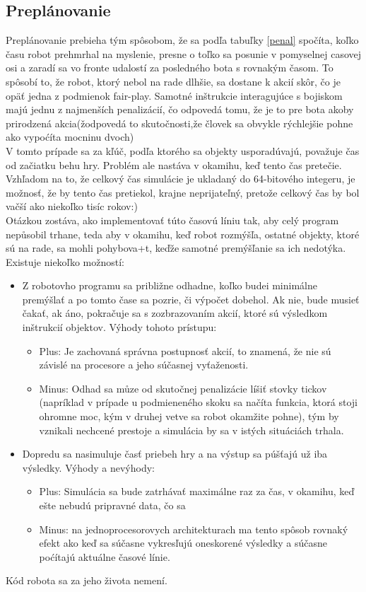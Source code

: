 \subsection{Preplánovanie}
Preplánovanie prebieha tým spôsobom, že sa podľa tabuľky \ref{penal} spočíta, koľko času robot prehmrhal na myslenie, presne o toľko sa posunie v pomyselnej casovej osi a zaradí sa vo fronte udalostí za posledného bota s rovnakým časom. To spôsobí to, že robot, ktorý nebol na rade dlhšie, sa dostane k akcií skôr, čo je opäť jedna z podmienok fair-play. Samotné inštrukcie interagujúce s bojiskom  majú jednu z najmenších penalizácií, čo odpovedá tomu, že je to pre bota akoby prirodzená akcia(žodpovedá to skutočnosti,že človek sa obvykle rýchlejšie pohne ako vypoćíta mocninu dvoch) \\
V tomto prípade sa za kľúč, podľa ktorého sa objekty usporadúvajú, považuje čas od začiatku behu hry. Problém ale nastáva v okamihu, keď tento čas pretečie. Vzhľadom na to, že celkový čas simulácie je ukladaný do 64-bitového integeru, je možnosť, že by tento čas pretiekol, krajne neprijateľný, pretože celkový čas by bol vačší ako niekoľko tisíc rokov:)\\
Otázkou zostáva, ako implementovať túto časovú líniu tak, aby celý program nepůsobil trhane, teda aby v okamihu, keď robot rozmýšľa, ostatné objekty, ktoré sú na rade, sa mohli pohybova+t, keďže samotné premýšľanie sa ich nedotýka. Existuje niekoľko možností:
\begin{itemize}
\item Z robotovho programu sa približne odhadne, koľko budei minimálne premýšlať a po tomto čase sa pozrie, či výpočet dobehol. Ak nie, bude musieť čakať, ak áno, pokračuje sa s zozbrazovaním akcií, ktoré sú výsledkom inštrukcií objektov. 
Výhody tohoto prístupu:\begin{itemize}
	\item Plus: Je zachovaná správna postupnosť akcií, to znamená, že nie sú závislé na procesore a jeho súčasnej vyťaženosti.
	\item Minus: Odhad sa můze od skutočnej penalizácie líšiť stovky tickov (napríklad v prípade u podmieneného skoku sa načíta funkcia, ktorá stoji ohromne moc, kým v druhej vetve sa robot okamžite pohne), tým by vznikali nechcené prestoje a simulácia by sa v istých situáciách trhala.
	\end{itemize}
\item Dopredu sa nasimuluje časť priebeh hry a na výstup sa púšťajú už iba výsledky. Výhody a nevýhody:
	\begin{itemize}
	\item Plus: Simulácia sa bude zatrhávať maximálne raz za čas, v okamihu, keď ešte nebudú pripravné data, čo sa 
	\item Minus: na jednoprocesorovych architekturach ma tento spôsob rovnaký efekt ako keď sa súčasne vykresľujú oneskorené výsledky a súčasne poćítajú aktuálne časové línie.
	\end{itemize}
\end{itemize}
Kód robota sa za jeho života nemení. 

